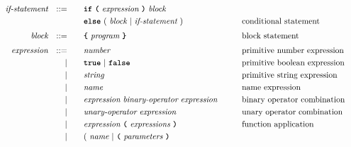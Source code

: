 \begin{alignat*}{9}
&& \textit{if-statement} && ::= &\quad &&  \textbf{\texttt{if}}\
                                   \textbf{\texttt{(}}\ \textit{expression} \ \textbf{\texttt{)}}\ 
                                   \textit{block} \\
&&                       &&     &      && \textbf{\texttt{else}}\
                                          (\ \textit{block}
                                          \ | \
                                          \textit{if-statement} \ )
                                                            && \textrm{conditional statement}   \\[1mm]
&& \textit{block}        && ::= &      && \textbf{\texttt{\{}}\  \textit{program}   \ \textbf{\texttt{\}}} \quad
                                                           && \textrm{block statement}\\[1mm]         
&& \textit{expression}   && ::= &\quad &&  \textit{number}   && \textrm{primitive number expression}\\
&&                       && |   &\quad && \textbf{\texttt{true}}\ |\ \textbf{\texttt{false}}
                                                           && \textrm{primitive boolean expression}\\
&&                       && |   &\quad &&  \textit{string}   && \textrm{primitive string expression}\\
&&                       && |   &\quad &&  \textit{name}   && \textrm{name expression}\\
&&                       && |   &\quad &&  \textit{expression} \  \textit{binary-operator} \ 
                                            \textit{expression} \qquad
                                                           && \textrm{binary operator combination}\\
&&                       && |   &\quad &&   \textit{unary-operator} \ 
                                            \textit{expression}
                                                           && \textrm{unary operator combination}\\
&&                       && |   &\quad &&   \textit{expression} \ 
                                            \textbf{\texttt{(}}\ \textit{expressions}\
                                            \textbf{\texttt{)}}
                                                           && \textrm{function application}\\
&&                       && |   &\quad &&   (\ \textit{name}\ | \
                                               \textbf{\texttt{(}}\ \textit{parameters}\ \textbf{\texttt{)}}\

\end{alignat*}

